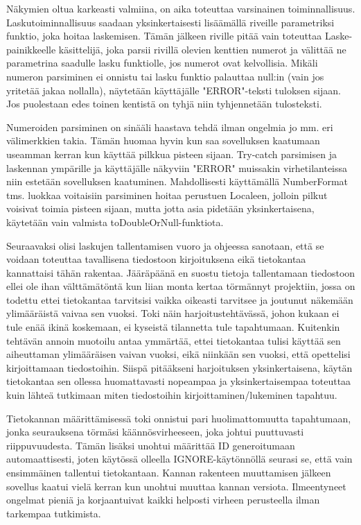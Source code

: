 Näkymien oltua karkeasti valmiina, on aika toteuttaa varsinainen
toiminnallisuus. Laskutoiminnallisuus saadaan yksinkertaisesti lisäämällä
riveille parametriksi funktio, joka hoitaa laskemisen. Tämän jälkeen riville
pitää vain toteuttaa Laske-painikkeelle käsittelijä, joka parsii rivillä
olevien kenttien numerot ja välittää ne parametrina saadulle lasku funktiolle,
jos numerot ovat kelvollisia. Mikäli numeron parsiminen ei onnistu tai lasku
funktio palauttaa null:in (vain jos yritetää jakaa nollalla), näytetään
käyttäjälle "ERROR"-teksti tuloksen sijaan. Jos puolestaan edes toinen kentistä
on tyhjä niin tyhjennetään tulosteksti.

Numeroiden parsiminen on sinääli haastava tehdä ilman ongelmia jo mm. eri
välimerkkien takia. Tämän huomaa hyvin kun saa sovelluksen kaatumaan useamman
kerran kun käyttää pilkkua pisteen sijaan. Try-catch parsimisen ja laskennan
ympärille ja käyttäjälle näkyviin "ERROR" muissakin virhetilanteissa niin
estetään sovelluksen kaatuminen. Mahdollisesti käyttämällä NumberFormat tms.
luokkaa voitaisiin parsiminen hoitaa perustuen Localeen, jolloin pilkut
voisivat toimia pisteen sijaan, mutta jotta asia pidetään yksinkertaisena,
käytetään vain valmista toDoubleOrNull-funktiota.

Seuraavaksi olisi laskujen tallentamisen vuoro ja ohjeessa sanotaan, että se
voidaan toteuttaa tavallisena tiedostoon kirjoituksena eikä tietokantaa
kannattaisi tähän rakentaa. Jääräpäänä en suostu tietoja tallentamaan
tiedostoon ellei ole ihan välttämätöntä kun liian monta kertaa törmännyt
projektiin, jossa on todettu ettei tietokantaa tarvitsisi vaikka oikeasti
tarvitsee ja joutunut näkemään ylimääräistä vaivaa sen vuoksi. Toki näin
harjoitustehtävässä, johon kukaan ei tule enää ikinä koskemaan, ei kyseistä
tilannetta tule tapahtumaan. Kuitenkin tehtävän annoin muotoilu antaa ymmärtää,
ettei tietokantaa tulisi käyttää sen aiheuttaman ylimääräisen vaivan vuoksi,
eikä niinkään sen vuoksi, että opettelisi kirjoittamaan tiedostoihin. Siispä
pitääkseni harjoituksen yksinkertaisena, käytän tietokantaa sen ollessa
huomattavasti nopeampaa ja yksinkertaisempaa toteuttaa kuin lähteä tutkimaan
miten tiedostoihin kirjoittaminen/lukeminen tapahtuu.

Tietokannan määrittämisessä toki onnistui pari huolimattomuutta tapahtumaan,
jonka seurauksena törmäsi käännösvirheeseen, joka johtui puuttuvasti
riippuvuudesta. Tämän lisäksi unohtui määrittää ID generoitumaan
automaattisesti, joten käytössä olleella IGNORE-käytönnöllä seurasi se, että
vain ensimmäinen tallentui tietokantaan. Kannan rakenteen muuttamisen jälkeen
sovellus kaatui vielä kerran kun unohtui muuttaa kannan versiota. Ilmeentyneet
ongelmat pieniä ja korjaantuivat kaikki helposti virheen perusteella ilman
tarkempaa tutkimista.

